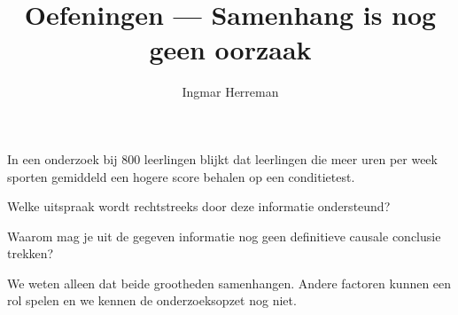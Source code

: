 \documentclass{ximera}
\title{Oefeningen --- Samenhang is nog geen oorzaak}
\author{Ingmar Herreman}
\begin{document}




















\maketitle




\begin{oefening}{\oefB \ESS}

In een onderzoek bij $800$ leerlingen blijkt dat leerlingen die meer
uren per week sporten gemiddeld een hogere score behalen op een
conditietest.

\begin{question}
Welke uitspraak wordt rechtstreeks door deze informatie ondersteund?

\begin{multipleChoice}
\end{multipleChoice}
\end{question}

\begin{question}
Waarom mag je uit de gegeven informatie nog geen definitieve causale
conclusie trekken?

\begin{oplossing}
We weten alleen dat beide grootheden samenhangen. Andere factoren
kunnen een rol spelen en we kennen de onderzoeksopzet nog niet.
\end{oplossing}
\end{question}
\end{oefening}
\end{document}
